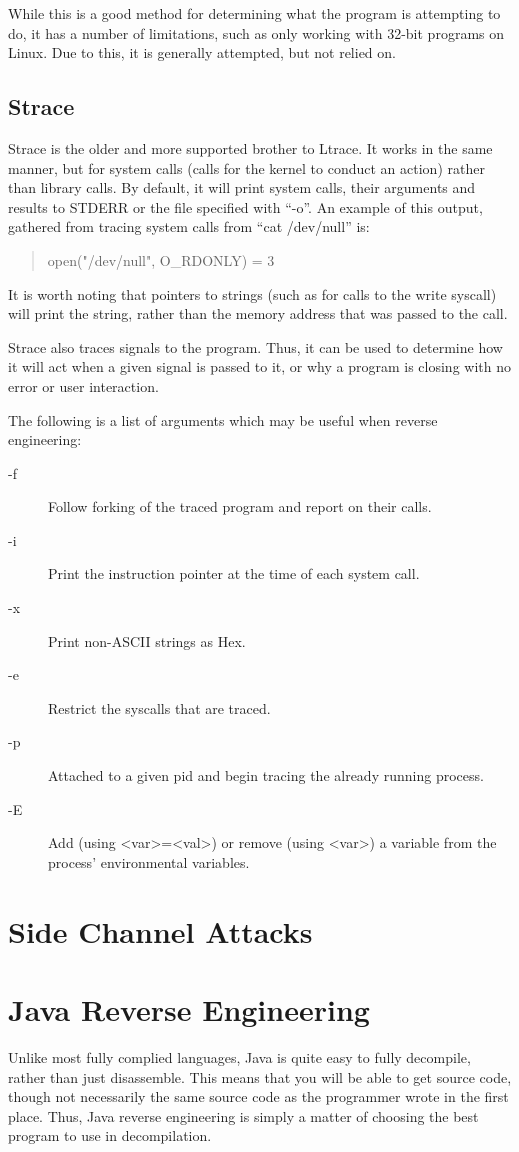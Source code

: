 			While this is a good method for determining what the program is attempting to do, it has a number of limitations, such as only working with 32-bit programs on Linux. 
			Due to this, it is generally attempted, but not relied on. 
		\subsection{Strace}
			Strace is the older and more supported brother to Ltrace. 
			It works in the same manner, but for system calls (calls for the kernel to conduct an action) rather than library calls. 
			By default, it will print system calls, their arguments and results to STDERR or the file specified with ``-o''. 
			An example of this output, gathered from tracing system calls from ``cat /dev/null'' is:
			\begin{quote}
				open("/dev/null", O\_RDONLY) = 3
			\end{quote}
			It is worth noting that pointers to strings (such as for calls to the write syscall) will print the string, rather than the memory address that was passed to the call. 

			Strace also traces signals to the program. 
			Thus, it can be used to determine how it will act when a given signal is passed to it, or why a program is closing with no error or user interaction. 
			
			The following is a list of arguments which may be useful when reverse engineering:
			\begin{description}
				\item[-f] Follow forking of the traced program and report on their calls. 
				\item[-i] Print the instruction pointer at the time of each system call. 
				\item[-x] Print non-ASCII strings as Hex. 
				\item[-e] Restrict the syscalls that are traced.
				\item[-p] Attached to a given pid and begin tracing the already running process. 
				\item[-E] Add (using <var>=<val>) or remove (using <var>) a variable from the process' environmental variables.
			\end{description}
	\section{Side Channel Attacks}
	\section{Java Reverse Engineering}
		Unlike most fully complied languages, Java is quite easy to fully decompile, rather than just disassemble. 
		This means that you will be able to get source code, though not necessarily the same source code as the programmer wrote in the first place. 
		Thus, Java reverse engineering is simply a matter of choosing the best program to use in decompilation. 

